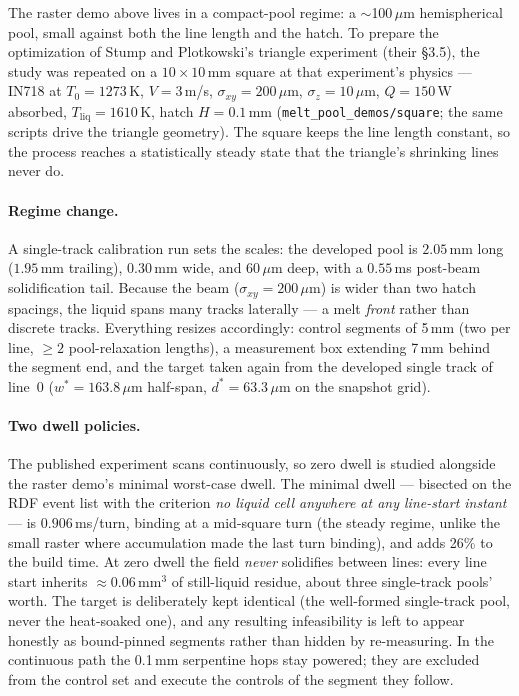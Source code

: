 \documentclass[11pt]{article}
\begin{document}
The raster demo above lives in a compact-pool regime: a $\sim$100\,$\mu$m
hemispherical pool, small against both the line length and the hatch. To
prepare the optimization of Stump and Plotkowski's triangle experiment
(their \S3.5), the study was repeated on a $10\times10$\,mm square at that
experiment's physics --- IN718 at $T_0=1273$\,K, $V=3$\,m/s,
$\sigma_{xy}=200\,\mu$m, $\sigma_z=10\,\mu$m, $Q=150$\,W absorbed,
$T_{\mathrm{liq}}=1610$\,K, hatch $H=0.1$\,mm
(\texttt{melt\_pool\_demos/square}; the same scripts drive the triangle
geometry). The square keeps the line length constant, so the process reaches
a statistically steady state that the triangle's shrinking lines never do.

\paragraph{Regime change.} A single-track calibration run sets the scales:
the developed pool is $2.05$\,mm long ($1.95$\,mm trailing), $0.30$\,mm
wide, and $60\,\mu$m deep, with a $0.55$\,ms post-beam solidification tail.
Because the beam ($\sigma_{xy}=200\,\mu$m) is wider than two hatch spacings,
the liquid spans many tracks laterally --- a melt \emph{front} rather than
discrete tracks. Everything resizes accordingly: control segments of 5\,mm
(two per line, $\geq 2$ pool-relaxation lengths), a measurement box
extending 7\,mm behind the segment end, and the target taken again from the
developed single track of line~0 ($w^\ast = 163.8\,\mu$m half-span,
$d^\ast = 63.3\,\mu$m on the snapshot grid).

\paragraph{Two dwell policies.} The published experiment scans
continuously, so zero dwell is studied alongside the raster demo's minimal
worst-case dwell. The minimal dwell --- bisected on the RDF event list with
the criterion \emph{no liquid cell anywhere at any line-start instant} ---
is $0.906$\,ms/turn, binding at a mid-square turn (the steady regime, unlike
the small raster where accumulation made the last turn binding), and adds
26\% to the build time. At zero dwell the field \emph{never} solidifies
between lines: every line start inherits $\approx 0.06$\,mm$^3$ of
still-liquid residue, about three single-track pools' worth. The target is
deliberately kept identical (the well-formed single-track pool, never the
heat-soaked one), and any resulting infeasibility is left to appear honestly
as bound-pinned segments rather than hidden by re-measuring. In the
continuous path the 0.1\,mm serpentine hops stay powered; they are excluded
from the control set and execute the controls of the segment they follow.
\end{document}
